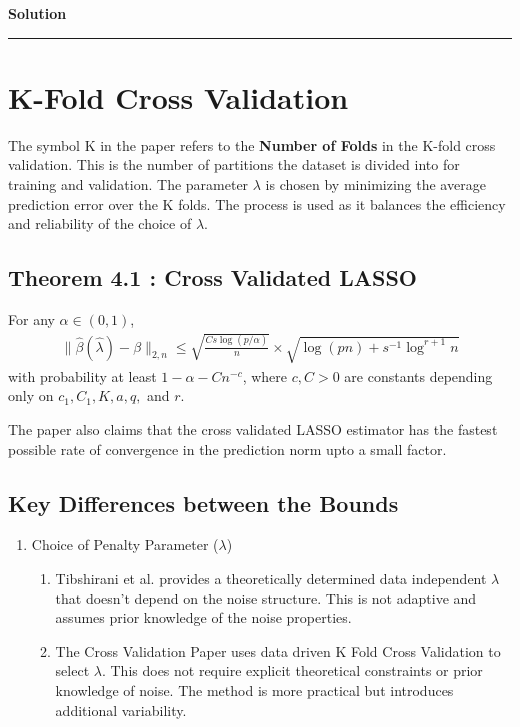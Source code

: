 \documentclass[a4paper,12pt]{article}
\newenvironment{solution}[2][]{%
    \begin{mdframed}[linecolor=blue!70!black, linewidth=2pt, roundcorner=10pt, backgroundcolor=yellow!10!white, skipabove=12pt, skipbelow=12pt]%
        \textbf{\large #2}
        \par\noindent\rule{\textwidth}{0.4pt}
}{
    \end{mdframed}
}
\begin{document}
\begin{solution}{Solution}
  \section{K-Fold Cross Validation}

  The symbol K in the paper refers to the \textbf{Number of Folds} in the K-fold cross validation. This is the number of partitions the dataset is divided into for training and validation. The parameter $\lambda$ is chosen by minimizing the average prediction error over the K folds. The process is used as it balances the efficiency and reliability of the choice of $\lambda$.
  
  \subsection{Theorem 4.1 : Cross Validated LASSO}
  For any \(\alpha \in (0, 1)\),
  \begin{align*}
  \|\hat{\beta}(\hat{\lambda}) - \beta\|_{2,n} \leq 
  \sqrt{\frac{C s \log(p/\alpha)}{n}} \times 
  \sqrt{\log(pn) + s^{-1} \log^{r+1} n}
  \end{align*}
  with probability at least $1 - \alpha - C n^{-c}$, where $c, C > 0$ are constants depending only on $c_1, C_1, K, a, q,$ and $r$.

  \noindent The paper also claims that the cross validated LASSO estimator has the fastest possible rate of convergence in the prediction norm upto a small factor. 

  \subsection{Key Differences between the Bounds}

  \begin{enumerate}
    \item Choice of Penalty Parameter ($\lambda$) 
    \begin{enumerate}
      \item Tibshirani et al. provides a theoretically determined data independent $\lambda$ that doesn't depend on the noise structure. This is not adaptive and assumes prior knowledge of the noise properties.
      \item The Cross Validation Paper uses data driven K Fold Cross Validation to select $\lambda$. This does not require explicit theoretical constraints or prior knowledge of noise. The method is more practical but introduces additional variability.
    \end{enumerate}


\end{enumerate}
\end{solution}
\end{document}
